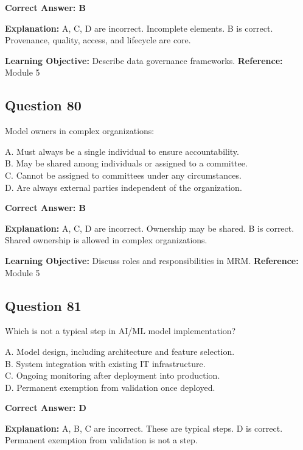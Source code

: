 \documentclass[11pt]{article}
\begin{document}
	\vspace{0.4em}
	\textbf{Correct Answer: B}
	
	\textbf{Explanation:}
	A, C, D are incorrect. Incomplete elements.
	B is correct. Provenance, quality, access, and lifecycle are core.
	
	\textbf{Learning Objective:} Describe data governance frameworks.
	\textbf{Reference:} Module 5
	
	\subsection*{Question 80}
	Model owners in complex organizations:
	
	A. Must always be a single individual to ensure accountability.\\
	B. May be shared among individuals or assigned to a committee.\\
	C. Cannot be assigned to committees under any circumstances.\\
	D. Are always external parties independent of the organization.
	
	\vspace{0.4em}
	\textbf{Correct Answer: B}
	
	\textbf{Explanation:}
	A, C, D are incorrect. Ownership may be shared.
	B is correct. Shared ownership is allowed in complex organizations.
	
	\textbf{Learning Objective:} Discuss roles and responsibilities in MRM.
	\textbf{Reference:} Module 5
	
	\subsection*{Question 81}
	Which is not a typical step in AI/ML model implementation?
	
	A. Model design, including architecture and feature selection.\\
	B. System integration with existing IT infrastructure.\\
	C. Ongoing monitoring after deployment into production.\\
	D. Permanent exemption from validation once deployed.
	
	\vspace{0.4em}
	\textbf{Correct Answer: D}
	
	\textbf{Explanation:}
	A, B, C are incorrect. These are typical steps.
	D is correct. Permanent exemption from validation is not a step.
	
\end{document}
